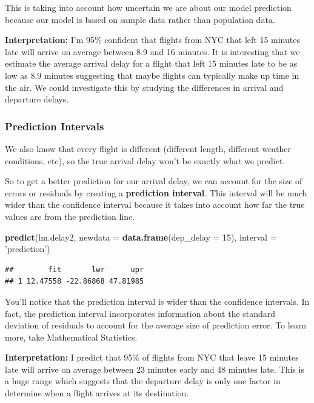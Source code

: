 \documentclass[
]{book}
\newenvironment{Shaded}{\begin{snugshade}}{\end{snugshade}}
\newcommand{\DataTypeTok}[1]{\textcolor[rgb]{0.13,0.29,0.53}{#1}}
\newcommand{\DecValTok}[1]{\textcolor[rgb]{0.00,0.00,0.81}{#1}}
\newcommand{\KeywordTok}[1]{\textcolor[rgb]{0.13,0.29,0.53}{\textbf{#1}}}
\newcommand{\NormalTok}[1]{#1}
\newcommand{\StringTok}[1]{\textcolor[rgb]{0.31,0.60,0.02}{#1}}
\begin{document}
This is taking into account how uncertain we are about our model prediction because our model is based on sample data rather than population data.

\textbf{Interpretation:} I'm 95\% confident that flights from NYC that left 15 minutes late will arrive on average between 8.9 and 16 minutes. It is interesting that we estimate the average arrival delay for a flight that left 15 minutes late to be as low as 8.9 minutes suggesting that maybe flights can typically make up time in the air. We could investigate this by studying the differences in arrival and departure delays.

\hypertarget{prediction-intervals}{%
\subsubsection{Prediction Intervals}\label{prediction-intervals}}

We also know that every flight is different (different length, different weather conditions, etc), so the true arrival delay won't be exactly what we predict.

So to get a better prediction for our arrival delay, we can account for the size of errors or residuals by creating a \textbf{prediction interval}. This interval will be much wider than the confidence interval because it takes into account how far the true values are from the prediction line.

\begin{Shaded}
\begin{Highlighting}[]
\KeywordTok{predict}\NormalTok{(lm.delay2, }\DataTypeTok{newdata =} \KeywordTok{data.frame}\NormalTok{(}\DataTypeTok{dep_delay =} \DecValTok{15}\NormalTok{), }\DataTypeTok{interval =} \StringTok{'prediction'}\NormalTok{)}
\end{Highlighting}
\end{Shaded}

\begin{verbatim}
##        fit       lwr      upr
## 1 12.47558 -22.86868 47.81985
\end{verbatim}

You'll notice that the prediction interval is wider than the confidence intervals. In fact, the prediction interval incorporates information about the standard deviation of residuals to account for the average size of prediction error. To learn more, take Mathematical Statistics.

\textbf{Interpretation:} I predict that 95\% of flights from NYC that leave 15 minutes late will arrive on average between 23 minutes early and 48 minutes late. This is a huge range which suggests that the departure delay is only one factor in determine when a flight arrives at its destination.
\end{document}
